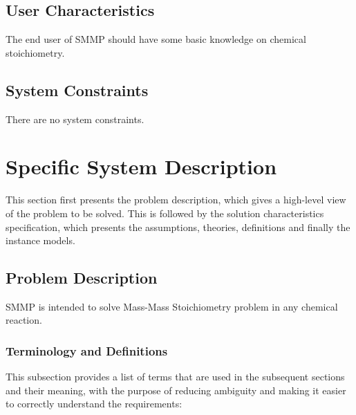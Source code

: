 \documentclass[12pt]{article}
\begin{document}
\subsection{User Characteristics} \label{SecUserCharacteristics}

The end user of SMMP should have some basic knowledge on chemical stoichiometry.

\subsection{System Constraints}

There are no system constraints.

\section{Specific System Description}

This section first presents the problem description, which gives a high-level
view of the problem to be solved.  This is followed by the solution characteristics
specification, which presents the assumptions, theories, definitions and finally
the instance models.  

\subsection{Problem Description} \label{Sec_pd}

SMMP is intended to solve  Mass-Mass Stoichiometry problem in any chemical reaction. 

\subsubsection{Terminology and  Definitions}

This subsection provides a list of terms that are used in the subsequent
sections and their meaning, with the purpose of reducing ambiguity and making it
easier to correctly understand the requirements:
\end{document}
